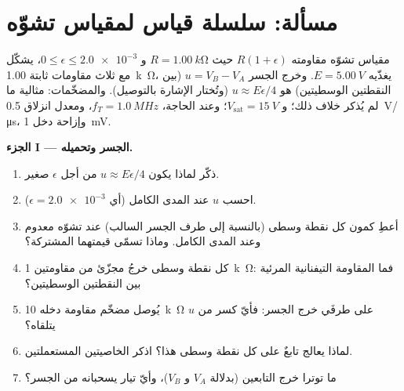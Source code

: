 \section{مسألة: سلسلة قياس لمقياس تشوّه}

\begin{problem}
\label{pb:b1:operational-amplifier:1}
مقياس تشوّه مقاومته $R(1 + \epsilon)$ حيث $R = \qty{1.00}{k\ohm}$ و
$0 \leq \epsilon \leq \num{2.0e-3}$، يشكّل  مع
ثلاث مقاومات ثابتة \qty{1.00}{k\ohm}، يغذّيه $E = \qty{5.00}{V}$.
وخرج الجسر $u = V_B - V_A$ (بين النقطتين الوسطيتين) هو
$u \approx E\epsilon/4$ (وتُختار الإشارة بالتوصيل). والمضخّمات:
مثالية ما لم يُذكر خلاف ذلك؛ و $V_{\mathrm{sat}} = \qty{15}{V}$؛ وعند الحاجة،
$f_T = \qty{1.0}{MHz}$، ومعدل انزلاق \qty{0.5}{V/\micro s}، وإزاحة دخل
\qty{1}{mV}.

\medskip
\noindent\textbf{الجزء I --- الجسر وتحميله.}
\begin{enumerate}
  \item ذكّر لماذا يكون $u \approx E\epsilon/4$ من أجل $\epsilon$ صغير.
  \item احسب $u$ عند المدى الكامل (أي $\epsilon = \num{2.0e-3}$).
  \item أعطِ كمون كل نقطة وسطى (بالنسبة إلى طرف الجسر
        السالب) عند تشوّه معدوم وعند المدى الكامل. وماذا تسمّى
        قيمتهما المشتركة؟
  \item كل نقطة وسطى خرجُ مجزّئ من مقاومتين \qty{1}{k\ohm}: فما
        المقاومة التيفنانية المرئية بين
        النقطتين الوسطيتين؟
  \item يُوصل مضخّم مقاومة دخله \qty{10}{k\ohm}
        على طرفَي خرج الجسر: فأيّ كسر من $u$
        يتلقاه؟
  \item لماذا يعالج تابعٌ على كل نقطة وسطى هذا؟ اذكر الخاصيتين
        المستعملتين.
  \item ما توترا خرج التابعين (بدلالة $V_A$ و
        $V_B$)، وأيّ تيار يسحبانه من الجسر؟
\end{enumerate}


\end{problem}
